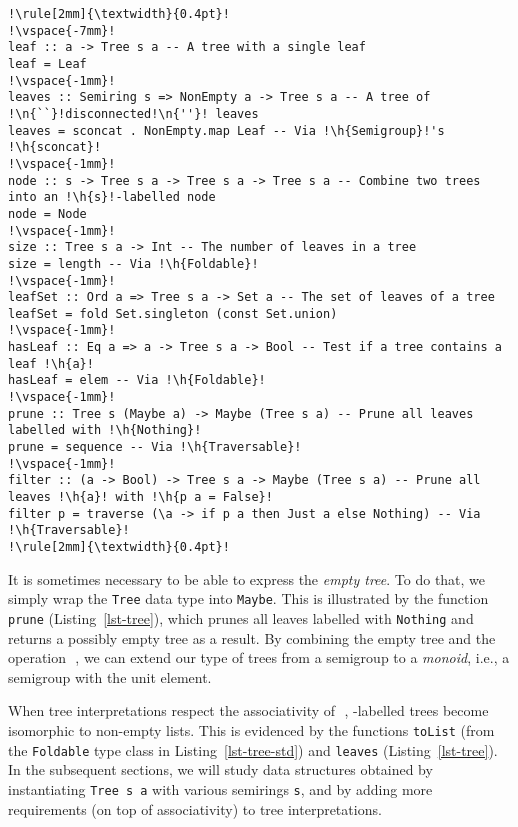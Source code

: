 \documentclass[english,submission]{programming}
\newcommand{\hcode}[1]{{\color{darkblue} \lstinline[keywordstyle={}]|#1|}} %
\newcommand{\h}[1]{{\itshape\color{grayblue}#1}} %
\newcommand{\n}[1]{{\itshape\color{graygreen}#1}} %
\newcommand{\zero}{\raisebox{-0.2mm}{\textcircled{0}}\xspace}
\newcommand{\dia}{\,\text{\raisebox{-0.3mm}{\Large $\diamond$}}\,}
\begin{document}
\begin{lstlisting}[float,label=lst-tree,xleftmargin=0pt,belowskip=-2mm,caption={
    API for constructing and manipulating trees.
}]
!\rule[2mm]{\textwidth}{0.4pt}!
!\vspace{-7mm}!
leaf :: a -> Tree s a -- A tree with a single leaf
leaf = Leaf
!\vspace{-1mm}!
leaves :: Semiring s => NonEmpty a -> Tree s a -- A tree of !\n{``}!disconnected!\n{''}! leaves
leaves = sconcat . NonEmpty.map Leaf -- Via !\h{Semigroup}!'s !\h{sconcat}!
!\vspace{-1mm}!
node :: s -> Tree s a -> Tree s a -> Tree s a -- Combine two trees into an !\h{s}!-labelled node
node = Node
!\vspace{-1mm}!
size :: Tree s a -> Int -- The number of leaves in a tree
size = length -- Via !\h{Foldable}!
!\vspace{-1mm}!
leafSet :: Ord a => Tree s a -> Set a -- The set of leaves of a tree
leafSet = fold Set.singleton (const Set.union)
!\vspace{-1mm}!
hasLeaf :: Eq a => a -> Tree s a -> Bool -- Test if a tree contains a leaf !\h{a}!
hasLeaf = elem -- Via !\h{Foldable}!
!\vspace{-1mm}!
prune :: Tree s (Maybe a) -> Maybe (Tree s a) -- Prune all leaves labelled with !\h{Nothing}!
prune = sequence -- Via !\h{Traversable}!
!\vspace{-1mm}!
filter :: (a -> Bool) -> Tree s a -> Maybe (Tree s a) -- Prune all leaves !\h{a}! with !\h{p a = False}!
filter p = traverse (\a -> if p a then Just a else Nothing) -- Via !\h{Traversable}!
!\rule[2mm]{\textwidth}{0.4pt}!
\end{lstlisting}

\noindent
It is sometimes necessary to be able to express the \emph{empty tree}. To do
that, we simply wrap the \hcode{Tree} data type into \hcode{Maybe}. This is
illustrated by the function \hcode{prune} (Listing~\ref{lst-tree}), which prunes
all leaves labelled with \hcode{Nothing} and returns a possibly empty tree as a
result. By combining the empty tree and the operation \dia, we can extend our
type of trees from a semigroup to a \emph{monoid}, i.e., a semigroup with the
unit element.

When tree interpretations respect the associativity of \dia, \zero-labelled
trees become isomorphic to non-empty lists. This is evidenced by the functions
\hcode{toList} (from the \hcode{Foldable} type class in
Listing~\ref{lst-tree-std}) and \hcode{leaves} (Listing~\ref{lst-tree}). In the
subsequent sections, we will study data structures obtained by instantiating
\hcode{Tree s a} with various semirings \hcode{s}, and by adding more
requirements (on top of associativity) to tree interpretations.
\end{document}
